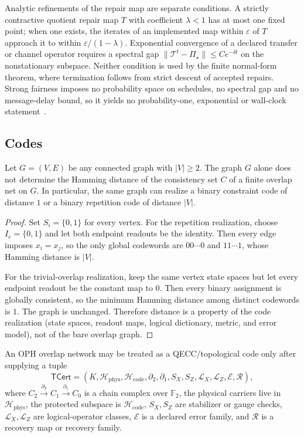 Analytic refinements of the repair map are separate conditions. A strictly
contractive quotient repair map \(T\) with coefficient \(\lambda<1\) has at
most one fixed point; when one exists, the iterates of an implemented map
within \(\varepsilon\) of \(T\) approach it to within
\(\varepsilon/(1-\lambda)\). Exponential
convergence of a declared transfer or channel operator requires a spectral
gap \(\|\mathcal T^t-\Pi_\star\|\le Ce^{-\delta t}\) on the nonstationary
subspace. Neither condition is used by the finite normal-form theorem, where
termination follows from strict descent of accepted repairs. Strong fairness
imposes no probability space on schedules, no spectral gap and no
message-delay bound, so it yields no probability-one, exponential or
wall-clock statement~\cite{FLP85}.

\subsection*{Codes}

\begin{theorem}
\label{thm:no-free-mincut}
Let \(G=(V,E)\) be any connected graph with \(|V|\ge2\). The graph \(G\) alone does not determine
the Hamming distance of the consistency set \(C\) of a finite overlap net on \(G\). In particular,
the same graph can realize a binary constraint code of distance \(1\) or a binary repetition code
of distance \(|V|\).
\end{theorem}

\begin{proof}
Set \(S_i=\{0,1\}\) for every vertex. For the repetition realization, choose \(I_e=\{0,1\}\) and
let both endpoint readouts be the identity. Then every edge imposes \(x_i=x_j\), so the only
global codewords are \(00\cdots0\) and \(11\cdots1\), whose Hamming distance is \(|V|\).

For the trivial-overlap realization, keep the same vertex state spaces but let every endpoint
readout be the constant map to \(0\). Then every binary assignment is globally consistent, so the
minimum Hamming distance among distinct codewords is \(1\). The graph is unchanged. Therefore
distance is a property of the code realization (state spaces, readout maps, logical dictionary,
metric, and error model), not of the bare overlap graph.
\end{proof}

\begin{definition}\label{def:tcert}
An OPH overlap network may be treated as a QECC/topological code only after supplying a tuple
\[
\mathsf{TCert}=
(K,\mathcal H_{\mathrm{phys}},\mathcal H_{\mathrm{code}},
\partial_2,\partial_1,S_X,S_Z,\mathcal L_X,\mathcal L_Z,\mathcal E,\mathcal R),
\]
where \(C_2\xrightarrow{\partial_2}C_1\xrightarrow{\partial_1}C_0\) is a chain complex over
\(\mathbb F_2\), the physical carriers live in \(\mathcal H_{\mathrm{phys}}\), the protected
subspace is \(\mathcal H_{\mathrm{code}}\), \(S_X,S_Z\) are stabilizer or gauge checks,
\(\mathcal L_X,\mathcal L_Z\) are logical-operator classes, \(\mathcal E\) is a declared error
family, and \(\mathcal R\) is a recovery map or recovery family.
\end{definition}

